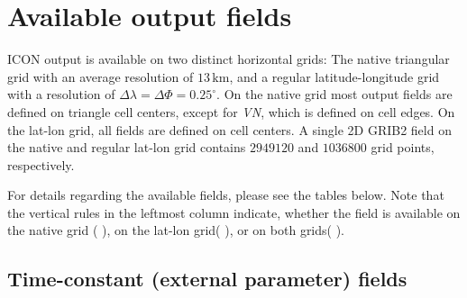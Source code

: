 \section{Available output fields}\label{sec_outfields}

ICON output is available on two distinct horizontal grids: The native triangular grid with an average resolution of $13\,\mathrm{km}$, and a regular latitude-longitude grid with 
a resolution of $\Delta \lambda = \Delta \Phi=0.25^{\circ}$. On the native grid most output fields are defined on triangle cell centers, except for \emph{VN}, which 
is defined on cell edges. On the lat-lon grid, all fields are defined on cell centers. A single 2D GRIB2 field on the native and regular lat-lon grid contains 
$2949120$ and $1036800$ grid points, respectively. 

For details regarding the available fields, please see the tables below. Note that the vertical rules in the leftmost column indicate, whether the field is 
available on the native grid ($\,$\markRed$\,$), on the lat-lon grid($\,$\markBlue$\,$), or on both grids($\,$\markRed\markBlue$\,$). 

\subsection{Time-constant (external parameter) fields}

